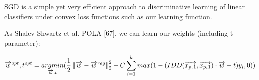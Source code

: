 SGD is a simple yet very efficient approach to discriminative learning of linear classifiers under convex loss functions such as our learning function.

As Shalev-Shwartz et al. POLA [67], we can learn our weights (including t parameter):

\begin{equation}

\overrightarrow{w}^{opt} , t^{opt} =\\ 
\underset{\overrightarrow{w} , t}{argmin} 


(\frac{1}{2}\left \| 

\overrightarrow{w} - \overrightarrow{w}^{reg} \right \|_2^2 + \\ C \sum_{i=1}^{k}max(1-(IDD(\overrightarrow{x_{p_i1}} , \overrightarrow{x_{p_i1}}) \cdot \overrightarrow{w} - t)y_i , 0))



\end{equation}